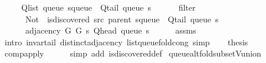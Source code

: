 \begin{isabellebody}
\ \ \ \ \ Q{\isacharunderscore}{\kern0pt}list\ {\isacharparenleft}{\kern0pt}queue\ {\isacharparenleft}{\kern0pt}s{\isasymlparr}queue\ {\isacharcolon}{\kern0pt}{\isacharequal}{\kern0pt}\ Q{\isacharunderscore}{\kern0pt}tail\ {\isacharparenleft}{\kern0pt}queue\ s{\isacharparenright}{\kern0pt}{\isasymrparr}{\isacharparenright}{\kern0pt}{\isacharparenright}{\kern0pt}\ {\isacharat}{\kern0pt}\isanewline
\ \ \ \ \ filter\isanewline
\ \ \ \ \ \ {\isacharparenleft}{\kern0pt}Not\ {\isasymcirc}\ is{\isacharunderscore}{\kern0pt}discovered\ src\ {\isacharparenleft}{\kern0pt}parent\ {\isacharparenleft}{\kern0pt}s{\isasymlparr}queue\ {\isacharcolon}{\kern0pt}{\isacharequal}{\kern0pt}\ Q{\isacharunderscore}{\kern0pt}tail\ {\isacharparenleft}{\kern0pt}queue\ s{\isacharparenright}{\kern0pt}{\isasymrparr}{\isacharparenright}{\kern0pt}{\isacharparenright}{\kern0pt}{\isacharparenright}{\kern0pt}\isanewline
\ \ \ \ \ \ {\isacharparenleft}{\kern0pt}adjacency\ G{}\ G{}\ s\ {\isacharparenleft}{\kern0pt}Q{\isacharunderscore}{\kern0pt}head\ {\isacharparenleft}{\kern0pt}queue\ s{\isacharparenright}{\kern0pt}{\isacharparenright}{\kern0pt}{\isacharparenright}{\kern0pt}{\isachardoublequoteclose}\isanewline
\ \ \ \ \isamarkupfalse%
\ assms\isanewline
\ \ \ \ \isamarkupfalse%
\ {\isacharparenleft}{\kern0pt}intro\ invar{\isacharunderscore}{\kern0pt}tail\ distinct{\isacharunderscore}{\kern0pt}adjacency\ list{\isacharunderscore}{\kern0pt}queue{\isacharunderscore}{\kern0pt}fold{\isacharunderscore}{\kern0pt}cong{\isacharparenright}{\kern0pt}\ simp{\isacharplus}{\kern0pt}\isanewline
\ \ \isamarkupfalse%
\ {\isacharquery}{\kern0pt}thesis\isanewline
\ \ \ \ \isamarkupfalse%
\ comp{\isacharunderscore}{\kern0pt}apply\isanewline
\ \ \ \ \isamarkupfalse%
\ {\isacharparenleft}{\kern0pt}simp\ add{\isacharcolon}{\kern0pt}\ is{\isacharunderscore}{\kern0pt}discovered{\isacharunderscore}{\kern0pt}def{\isacharparenright}{\kern0pt}\isanewline
{}\isamarkupfalse%
%
\endisatagproof
{\isafoldproof}%
%
\isadelimproof
%
\endisadelimproof
%
\isadelimdocument
%
\endisadelimdocument
%
\isatagdocument
%
\isamarkuptrue%
%
\endisatagdocument
{\isafolddocument}%
%
\isadelimdocument
%
\endisadelimdocument
{}\isamarkupfalse%
\ queue{\isacharunderscore}{\kern0pt}alt{\isacharunderscore}{\kern0pt}fold{\isacharunderscore}{\kern0pt}subset{\isacharunderscore}{\kern0pt}V{\isacharunderscore}{\kern0pt}union{\isacharcolon}{\kern0pt}\isanewline

\end{isabellebody}
